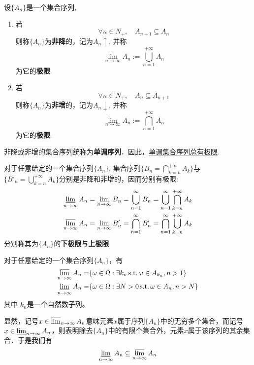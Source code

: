 \begin{definition}[集合的极限]
    设$\{ A_n \}$是一个集合序列,
    \begin{enumerate}
        \item 若
              \[ \forall n \in N_+ ,\quad A_{n+1} \subseteq A_n \]
              则称$\{ A_n \}$为\textbf{非降}的，记为$A_n\uparrow$, 并称
              \[ \lim_{n \to \infty}A_n := \bigcup_{n=1}^{+\infty}A_n \]
              为它的\textbf{极限}.
        \item 若
              \[ \forall n \in N_+ ,\quad A_{n} \subseteq A_{n+1} \]
              则称$\{ A_n \}$为\textbf{非增}的，记为$A_n\downarrow$, 并称
              \[ \lim_{n \to \infty}A_n := \bigcap_{n=1}^{+\infty}A_n \]
              为它的\textbf{极限}.
    \end{enumerate}
    非降或非增的集合序列统称为\textbf{单调序列}．因此，\underline{单调集合序列总有极限}.
\end{definition}

\begin{definition}[上极限与下极限]
    对于任意给定的一个集合序列$\{ A_n \}$, 集合序列$\{B_n= \bigcap_{k=n}^{+\infty}A_k \}$与$\{B'_n=  \bigcup_{k=n}^{+\infty}A_k \}$分别是非降和非增的，因而分别有极限:
    \begin{align*}
        \varliminf_{n \to \infty}A_n =\lim_{n \to \infty} B_n = \bigcup_{n=1}^{\infty} B_n= \bigcup_{n=1}^{\infty} \bigcap_{k=n}^{+\infty}A_k \\
        \varlimsup_{n \to \infty}A_n =\lim_{n \to \infty} B'_n = \bigcap_{n=1}^{\infty} B'_n= \bigcap_{n=1}^{\infty} \bigcup_{k=n}^{+\infty}A_k
    \end{align*}
    分别称其为$\{ A_n \}$的\textbf{下极限}与\textbf{上极限}
\end{definition}

\begin{proposition}
    对于任意给定的一个集合序列$\{ A_n \}$，有
    \begin{align*}
        \varlimsup_{n \to \infty}A_n =& \{ \omega \in \Omega : \exists k_n \, \mathrm{s.t.}\, \omega \in A_{k_n}, n>1 \}  \\
        \varliminf_{n \to \infty}A_n =& \{ \omega \in \Omega : \exists N>0 \, \mathrm{s.t.}\, \omega \in A_n, n>N \}
    \end{align*}
    其中 $k_n$是一个自然数子列。
\end{proposition}

显然，记号$x \in \varlimsup_{n \to \infty}A_n $意味元素$x$属于序列$\{ A_n \}$中的无穷多个集合，而记号$x \in \varliminf_{n \to \infty}A_n $，则表明除去$\{ A_n \}$中的有限个集合外，元素$x$属于该序列的其余集合．于是我们有
\[ \varliminf_{n \to \infty}A_n \subseteq  \varlimsup_{n \to \infty}A_n \]

